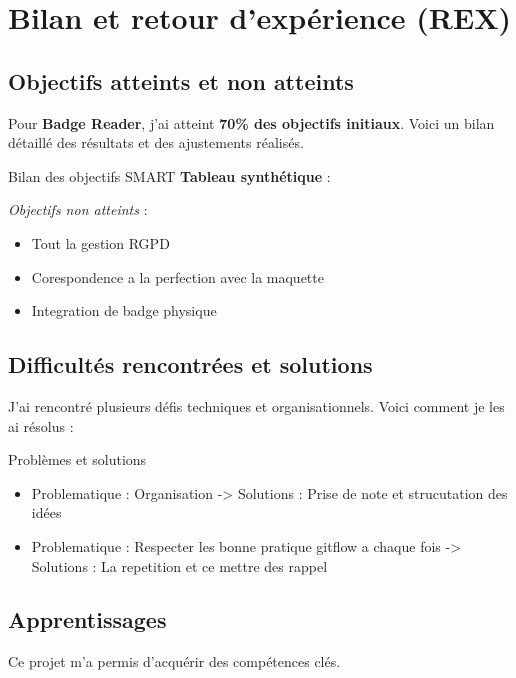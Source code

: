 \chapter{Bilan et retour d'expérience (REX)}

\section{Objectifs atteints et non atteints}
Pour \textbf{Badge Reader}, j’ai atteint \textbf{70\% des objectifs initiaux}. Voici un bilan détaillé des résultats et des ajustements réalisés.
\newline

\begin{for_you}{Bilan des objectifs SMART}
    \textbf{Tableau synthétique} :

    \textit{Objectifs non atteints} :
    \begin{itemize}
        \item Tout la gestion RGPD
        \item Corespondence a la perfection avec la maquette
        \item Integration de badge physique
    \end{itemize}
\end{for_you}

\section{Difficultés rencontrées et solutions}
J’ai rencontré plusieurs défis techniques et organisationnels. Voici comment je les ai résolus :

\begin{for_you}{Problèmes et solutions}
    \begin{itemize}
        \item Problematique : Organisation \newline
        -> Solutions : Prise de note et strucutation des idées 
        \item Problematique : Respecter les bonne pratique gitflow a chaque fois \newline
        -> Solutions : La repetition et ce mettre des rappel 
    \end{itemize}
\end{for_you}

\section{Apprentissages}
Ce projet m’a permis d’acquérir des compétences clés.

